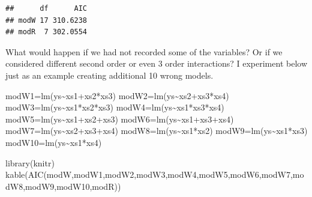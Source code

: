\documentclass[
]{book}
\newenvironment{Shaded}{\begin{snugshade}}{\end{snugshade}}
\newcommand{\FunctionTok}[1]{\textcolor[rgb]{0.00,0.00,0.00}{#1}}
\newcommand{\NormalTok}[1]{#1}
\newcommand{\OtherTok}[1]{\textcolor[rgb]{0.56,0.35,0.01}{#1}}
\newcommand{\SpecialCharTok}[1]{\textcolor[rgb]{0.00,0.00,0.00}{#1}}
\begin{document}
\begin{verbatim}
##      df      AIC
## modW 17 310.6238
## modR  7 302.0554
\end{verbatim}

What would happen if we had not recorded some of the variables? Or if we considered different second order or even 3 order interactions? I experiment below just as an example creating additional 10 wrong models.

\begin{Shaded}
\begin{Highlighting}[]
\NormalTok{modW1}\OtherTok{=}\FunctionTok{lm}\NormalTok{(ys}\SpecialCharTok{\textasciitilde{}}\NormalTok{xs1}\SpecialCharTok{+}\NormalTok{xs2}\SpecialCharTok{*}\NormalTok{xs3)}
\NormalTok{modW2}\OtherTok{=}\FunctionTok{lm}\NormalTok{(ys}\SpecialCharTok{\textasciitilde{}}\NormalTok{xs2}\SpecialCharTok{+}\NormalTok{xs3}\SpecialCharTok{*}\NormalTok{xs4)}
\NormalTok{modW3}\OtherTok{=}\FunctionTok{lm}\NormalTok{(ys}\SpecialCharTok{\textasciitilde{}}\NormalTok{xs1}\SpecialCharTok{*}\NormalTok{xs2}\SpecialCharTok{*}\NormalTok{xs3)}
\NormalTok{modW4}\OtherTok{=}\FunctionTok{lm}\NormalTok{(ys}\SpecialCharTok{\textasciitilde{}}\NormalTok{xs1}\SpecialCharTok{*}\NormalTok{xs3}\SpecialCharTok{*}\NormalTok{xs4)}
\NormalTok{modW5}\OtherTok{=}\FunctionTok{lm}\NormalTok{(ys}\SpecialCharTok{\textasciitilde{}}\NormalTok{xs1}\SpecialCharTok{+}\NormalTok{xs2}\SpecialCharTok{+}\NormalTok{xs3)}
\NormalTok{modW6}\OtherTok{=}\FunctionTok{lm}\NormalTok{(ys}\SpecialCharTok{\textasciitilde{}}\NormalTok{xs1}\SpecialCharTok{+}\NormalTok{xs3}\SpecialCharTok{+}\NormalTok{xs4)}
\NormalTok{modW7}\OtherTok{=}\FunctionTok{lm}\NormalTok{(ys}\SpecialCharTok{\textasciitilde{}}\NormalTok{xs2}\SpecialCharTok{+}\NormalTok{xs3}\SpecialCharTok{+}\NormalTok{xs4)}
\NormalTok{modW8}\OtherTok{=}\FunctionTok{lm}\NormalTok{(ys}\SpecialCharTok{\textasciitilde{}}\NormalTok{xs1}\SpecialCharTok{*}\NormalTok{xs2)}
\NormalTok{modW9}\OtherTok{=}\FunctionTok{lm}\NormalTok{(ys}\SpecialCharTok{\textasciitilde{}}\NormalTok{xs1}\SpecialCharTok{*}\NormalTok{xs3)}
\NormalTok{modW10}\OtherTok{=}\FunctionTok{lm}\NormalTok{(ys}\SpecialCharTok{\textasciitilde{}}\NormalTok{xs1}\SpecialCharTok{*}\NormalTok{xs4)}
\end{Highlighting}
\end{Shaded}

\begin{Shaded}
\begin{Highlighting}[]
\FunctionTok{library}\NormalTok{(knitr)}
\FunctionTok{kable}\NormalTok{(}\FunctionTok{AIC}\NormalTok{(modW,modW1,modW2,modW3,modW4,modW5,modW6,modW7,modW8,modW9,modW10,modR))}
\end{Highlighting}
\end{Shaded}
\end{document}
